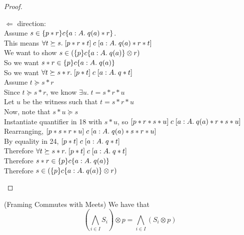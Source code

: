 \begin{proof}
\begin{tabbedproof}
\oooo $\Leftarrow$ direction: \\
\ooooo Assume $s \in \{{p * r}\}{c}\{{a:A}.\;{q(a) * r}\}$. \\
\oooooo This means $\forall t \succeq s.\; [{p * r * t}]\;{c}\;[{a:A}.\;{q(a) * r * t}]$ \\
\oooooo We want to show $s \in (\{{p}\}{c}\{{a:A}.\;{q(a)}\} \otimes r)$ \\
\oooooo So we want $s * r \in \{{p}\}{c}\{{a:A}.\;{q(a)}\}$ \\
\oooooo So we want $\forall t \succeq s * r.\; [{p * t}]\;{c}\;[{a:A}.\;{q * t}]$ \\
\oooooo Assume $t \succeq s * r$ \\
\ooooooo Since $t \succeq s * r$, we know $\exists u.\; t = s * r * u$ \\
\ooooooo Let $u$ be the witness such that $t = s * r * u$ \\
\ooooooo Now, note that $s * u \succeq s$ \\
\ooooooo Instantiate quantifier in 18 with $s * u$, so 
         $[{p * r * s * u}]\;{c}\;[{a:A}.\;{q(a) * r * s * u}]$ \\
\ooooooo Rearranging, $[{p * s * r * u}]\;{c}\;[{a:A}.\;{q(a) * s * r * u}]$ \\
\ooooooo By equality in 24, $[{p * t}]\;{c}\;[{a:A}.\;{q * t}]$ \\
\oooooo Therefore $\forall t \succeq s * r.\; [{p * t}]\;{c}\;[{a:A}.\;{q * t}]$ \\
\oooooo Therefore $s * r \in \{{p}\}{c}\{{a:A}.\;{q(a)}\}$ \\
\oooooo Therefore $s \in (\{{p}\}{c}\{{a:A}.\;{q(a)}\} \otimes r)$ 
\end{tabbedproof}
\end{proof}

\begin{lemma}{(Framing Commutes with Meets)}
We have that 
\begin{displaymath}
\left(\bigwedge_{i \in I} S_i\right) \otimes p = \bigwedge_{i \in I} (S_i \otimes p)
\end{displaymath}
\end{lemma}

